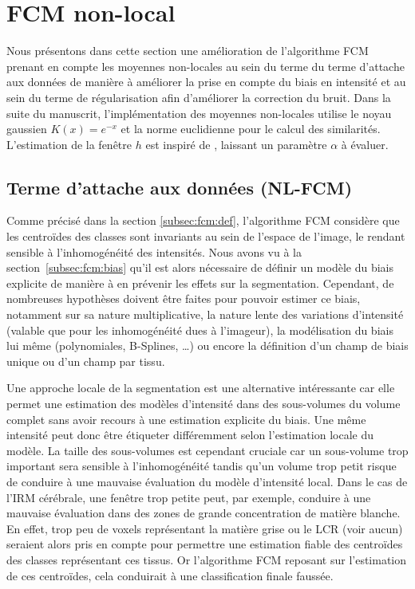 
\section{FCM non-local}
\label{sec:nlfcm}

Nous présentons dans cette section une amélioration de l'algorithme FCM prenant en compte les moyennes non-locales au sein du terme du terme d'attache aux données de manière à améliorer la prise en compte du biais en intensité et au sein du terme de régularisation afin d'améliorer la correction du bruit.
Dans la suite du manuscrit, l'implémentation des moyennes non-locales utilise le noyau gaussien $K(x) = e^{-x}$ et la norme euclidienne pour le calcul des similarités. 
L'estimation de la fenêtre $h$ est inspiré de \cite{Coupe:TMI:2008}, laissant un paramètre $\alpha$ à évaluer.

\subsection{Terme d'attache aux données (NL-FCM)}
\label{subsec:nl:dd}

Comme précisé dans la section \ref{subsec:fcm:def}, l'algorithme FCM considère que les centroïdes des classes sont invariants au sein de l'espace de l'image, le rendant sensible à l'inhomogénéité des intensités.
Nous avons vu à la section~\ref{subsec:fcm:bias} qu'il est alors nécessaire de définir un modèle du biais explicite de manière à en prévenir les effets sur la segmentation.
Cependant, de nombreuses hypothèses doivent être faites pour pouvoir estimer ce biais, notamment sur sa nature multiplicative, la nature lente des variations d'intensité (valable que pour les inhomogénéité dues à l'imageur), la modélisation du biais lui même (polynomiales, B-Splines, \ldots{}) ou encore la définition d'un champ de biais unique ou d'un champ par tissu.

Une approche locale de la segmentation est une alternative intéressante car elle permet une estimation des modèles d'intensité dans des sous-volumes du volume complet sans avoir recours à une estimation explicite du biais.
Une même intensité peut donc être étiqueter différemment selon l'estimation locale du modèle.
La taille des sous-volumes est cependant cruciale car un sous-volume trop important sera sensible à l'inhomogénéité tandis qu'un volume trop petit risque de conduire à une mauvaise évaluation du modèle d'intensité local. 
Dans le cas de l'IRM cérébrale, une fenêtre trop petite peut, par exemple, conduire à une mauvaise évaluation dans des zones de grande concentration de matière blanche.
En effet, trop peu de voxels représentant la matière grise ou le LCR (voir aucun) seraient alors pris en compte pour permettre une estimation fiable des centroïdes des classes représentant ces tissus. 
Or l'algorithme FCM reposant sur l'estimation de ces centroïdes, cela conduirait à une classification finale faussée.

